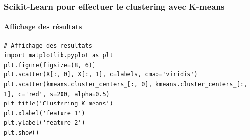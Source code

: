 \documentclass{beamer}
\begin{document}
\begin{frame}[fragile]
	\frametitle{Scikit-Learn pour effectuer le clustering avec K-means}
	\framesubtitle{Affichage des résultats}
\begin{lstlisting}
# Affichage des resultats
import matplotlib.pyplot as plt
plt.figure(figsize=(8, 6))
plt.scatter(X[:, 0], X[:, 1], c=labels, cmap='viridis')
plt.scatter(kmeans.cluster_centers_[:, 0], kmeans.cluster_centers_[:, 1], c='red', s=200, alpha=0.5)
plt.title('Clustering K-means')
plt.xlabel('feature 1')
plt.ylabel('feature 2')
plt.show()
\end{lstlisting}
\end{frame}
\end{document}
